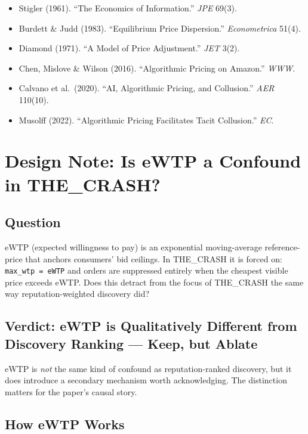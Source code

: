 \documentclass{article}
\begin{document}
\begin{itemize}
  \item Stigler (1961). ``The Economics of Information.'' \textit{JPE} 69(3).
  \item Burdett \& Judd (1983). ``Equilibrium Price Dispersion.'' \textit{Econometrica} 51(4).
  \item Diamond (1971). ``A Model of Price Adjustment.'' \textit{JET} 3(2).
  \item Chen, Mislove \& Wilson (2016). ``Algorithmic Pricing on Amazon.'' \textit{WWW}.
  \item Calvano et al.\ (2020). ``AI, Algorithmic Pricing, and Collusion.'' \textit{AER} 110(10).
  \item Musolff (2022). ``Algorithmic Pricing Facilitates Tacit Collusion.'' \textit{EC}.
\end{itemize}

\section{Design Note: Is eWTP a Confound in THE\_CRASH?}

\subsection{Question}

eWTP (expected willingness to pay) is an exponential moving-average reference-price that anchors consumers' bid ceilings. In THE\_CRASH it is forced on: \texttt{max\_wtp = eWTP} and orders are suppressed entirely when the cheapest visible price exceeds eWTP. Does this detract from the focus of THE\_CRASH the same way reputation-weighted discovery did?

\subsection{Verdict: eWTP is Qualitatively Different from Discovery Ranking — Keep, but Ablate}

eWTP is \emph{not} the same kind of confound as reputation-ranked discovery, but it does introduce a secondary mechanism worth acknowledging. The distinction matters for the paper's causal story.

\subsection{How eWTP Works}
\end{document}
